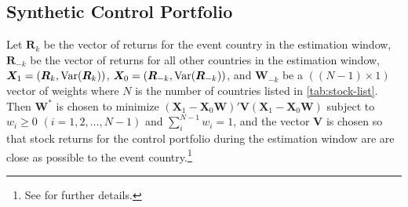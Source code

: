 \documentclass[12pt,final,fleqn]{article}
\theoremstyle{plain}
\newcommand\var{{\rm Var}}
\begin{document}
\subsection{Synthetic Control Portfolio}
Let $\boldsymbol{R}_{k}$ be the vector of returns for the event country in the estimation window, $\boldsymbol{R}_{-k}$ be the vector of returns for all other countries in the estimation window, $\boldsymbol{X}_1=(\boldsymbol{R}_{k},\var(\boldsymbol{R}_{k}))$, $\boldsymbol{X}_0=(\boldsymbol{R}_{-k},\var(\boldsymbol{R}_{-k}))$, and $\boldsymbol{W}_{-k}$ be a $((N-1) \times 1)$ vector of weights where $N$ is the number of countries listed in \autoref{tab:stock-list}. Then $\boldsymbol{W}^*$ is chosen to minimize $(\boldsymbol{X}_1-\boldsymbol{X}_0\boldsymbol{W})'\boldsymbol{V}(\boldsymbol{X}_1-\boldsymbol{X}_0\boldsymbol{W})$ subject to $w_i\geq0$ $(i = 1,2,\ldots,N-1)$ and $\sum_i^{N-1} w_i = 1$, and the vector $\boldsymbol{V}$ is chosen so that stock returns for the control portfolio during the estimation window are are close as possible to the event country.\footnote{See \citet{abadie2003economic} for further details.}

\newpage
{}

\end{document}
